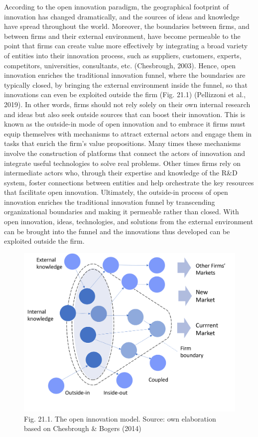 \documentclass[
  letterpaper,
  DIV=11,
  numbers=noendperiod]{scrreprt}
\begin{document}
According to the open innovation paradigm, the geographical footprint of
innovation has changed dramatically, and the sources of ideas and
knowledge have spread throughout the world. Moreover, the boundaries
between firms, and between firms and their external environment, have
become permeable to the point that firms can create value more
effectively by integrating a broad variety of entities into their
innovation process, such as suppliers, customers, experts, competitors,
universities, consultants, etc. (Chesbrough, 2003). Hence, open
innovation enriches the traditional innovation funnel, where the
boundaries are typically closed, by bringing the external environment
inside the funnel, so that innovations can even be exploited outside the
firm (Fig. 21.1) (Pellizzoni et al., 2019). In other words, firms should
not rely solely on their own internal research and ideas but also seek
outside sources that can boost their innovation. This is known as the
outside-in mode of open innovation and to embrace it firms must equip
themselves with mechanisms to attract external actors and engage them in
tasks that enrich the firm's value propositions. Many times these
mechanisms involve the construction of platforms that connect the actors
of innovation and integrate useful technologies to solve real problems.
Other times firms rely on intermediate actors who, through their
expertise and knowledge of the R\&D system, foster connections between
entities and help orchestrate the key resources that facilitate open
innovation. Ultimately, the outside-in process of open innovation
enriches the traditional innovation funnel by transcending
organizational boundaries and making it permeable rather than closed.
With open innovation, ideas, technologies, and solutions from the
external environment can be brought into the funnel and the innovations
thus developed can be exploited outside the firm.

\begin{figure}

{\centering \includegraphics[width=6.25in,height=\textheight]{img/fig33.png}

}

\caption{Fig. 21.1. The open innovation model. Source: own elaboration
based on Chesbrough \& Bogers (2014)}

\end{figure}
\end{document}
